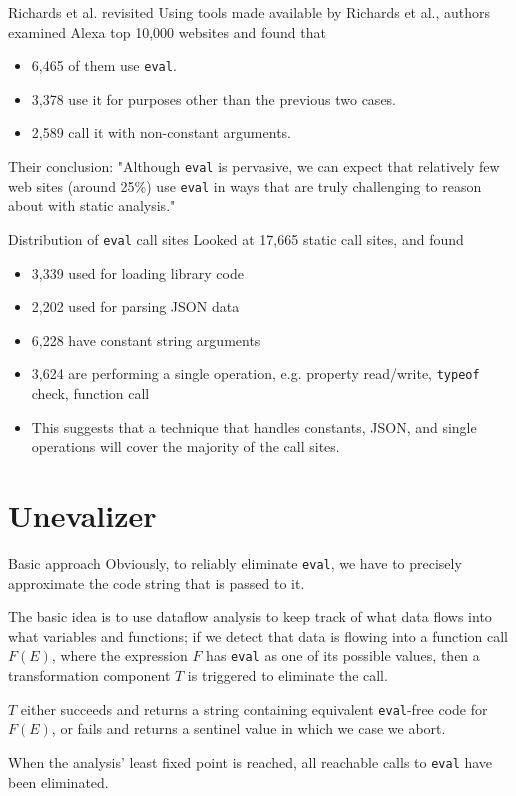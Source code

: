 \documentclass{beamer}
\begin{document}
\begin{frame}{Richards et al. revisited}
Using tools made available by Richards et al., authors examined Alexa top
10,000 websites and found that
\begin{itemize}
\item 6,465 of them use {\tt eval}.
\item 3,378 use it for purposes other than the previous two cases.
\item 2,589 call it with non-constant arguments.
\end{itemize}
Their conclusion: "Although {\tt eval} is pervasive, we can expect that
relatively few web sites (around 25\%) use {\tt eval} in ways that are
truly challenging to reason about with static analysis."
\end{frame}

\begin{frame}{Distribution of {\tt eval} call sites}
Looked at 17,665 static call sites, and found
\begin{itemize}
\item 3,339 used for loading library code
\item 2,202 used for parsing JSON data
\item 6,228 have constant string arguments
\item 3,624 are performing a single operation, e.g. property read/write,
{\tt typeof} check, function call
\item This suggests that a technique that handles constants, JSON, and
single operations will cover the majority of the call sites.
\end{itemize}
\end{frame}

\section{Unevalizer}

\begin{frame}{Basic approach}
Obviously, to reliably eliminate {\tt eval}, we have to precisely
approximate the code string that is passed to it. \vspace{5mm}

The basic idea is to use dataflow analysis to keep track of what data
flows into what variables and functions; if we detect that data is flowing
into a function call $F(E)$, where the expression $F$ has {\tt eval} as
one of its possible values, then a transformation component $T$ is
triggered to eliminate the call. \vspace{5mm}

$T$ either succeeds and returns a string containing equivalent
{\tt eval}-free code for $F(E)$, or fails and returns a sentinel value
in which we case we abort. \vspace{5mm}

When the analysis' least fixed point is reached, all reachable
calls to {\tt eval} have been eliminated.
\end{frame}
\end{document}
